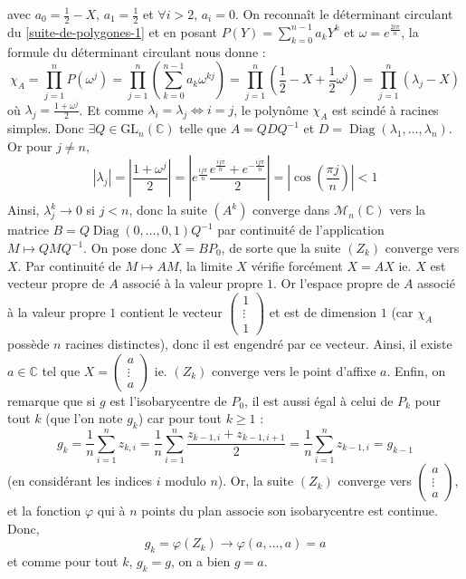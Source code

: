 \begin{demonstration}
		avec $a_0 = \frac{1}{2} - X$, $a_1 = \frac{1}{2}$ et $\forall i > 2, \, a_i = 0$. On reconnaît le déterminant circulant du \cref{suite-de-polygones-1} et en posant $P(Y) = \sum_{k=0}^{n-1} a_k Y^k$ et $\omega = e^{\frac{2i\pi}{n}}$, la formule du déterminant circulant nous donne :
		\[ \chi_A = \prod_{j=1}^n P(\omega^j) = \prod_{j=1}^n \left( \sum_{k=0}^{n-1} a_k \omega^{kj} \right) = \prod_{j=1}^n \left( \frac{1}{2} - X + \frac{1}{2} \omega^j \right) = \prod_{j=1}^n (\lambda_j - X) \]
		où $\lambda_j = \frac{1+\omega^j}{2}$. Et comme $\lambda_i = \lambda_j \iff i = j$, le polynôme $\chi_A$ est scindé à racines simples. Donc $\exists Q \in \mathrm{GL}_n(\mathbb{C})$ telle que $A=QDQ^{-1}$ et $D = \operatorname{Diag}(\lambda_1, \dots, \lambda_n)$.
		Or pour $j \neq n$,
		\[ |\lambda_j| = \left| \frac{1 + \omega^j}{2} \right| = \left| e^{\frac{ij \pi}{n}} \frac{e^{\frac{ij \pi}{n}} + e^{-\frac{ij \pi}{n}}}{2} \right| = \left| \cos \left( \frac{\pi j}{n} \right) \right| < 1 \]
		Ainsi, $\lambda_j^k \longrightarrow 0$ si $j < n$, donc la suite $(A^k)$ converge dans $\mathcal{M}_n(\mathbb{C})$ vers la matrice $B = Q \operatorname{Diag}(0, \dots, 0, 1)Q^{-1}$ par continuité de l'application $M \mapsto QMQ^{-1}$.
		\newpar
		On pose donc $X = B P_0$, de sorte que la suite $(Z_k)$ converge vers $X$. Par continuité de $M \mapsto AM$, la limite $X$ vérifie forcément $X = AX$ ie. $X$ est vecteur propre de $A$ associé à la valeur propre $1$. Or l'espace propre de $A$ associé à la valeur propre $1$ contient le vecteur $\begin{pmatrix} 1 \\ \vdots \\ 1 \end{pmatrix}$ et est de dimension $1$ (car $\chi_A$ possède $n$ racines distinctes), donc il est engendré par ce vecteur. Ainsi, il existe $a \in \mathbb{C}$ tel que $X = \begin{pmatrix} a \\ \vdots \\ a \end{pmatrix}$ ie. $(Z_k)$ converge vers le point d'affixe $a$.
		\newpar
		Enfin, on remarque que si $g$ est l'isobarycentre de $P_0$, il est aussi égal à celui de $P_k$ pour tout $k$ (que l'on note $g_k$) car pour tout $k \geq 1$ :
		\[ g_k = \frac{1}{n} \sum_{i=1}^n z_{k,i} = \frac{1}{n} \sum_{i=1}^n \frac{z_{k-1,i} + z_{k-1,i+1}}{2} = \frac{1}{n} \sum_{i=1}^n z_{k-1,i} = g_{k-1} \]
		(en considérant les indices $i$ modulo $n$). Or, la suite $(Z_k)$ converge vers $\begin{pmatrix} a \\ \vdots \\ a \end{pmatrix}$, et la fonction $\varphi$ qui à $n$ points du plan associe son isobarycentre est continue. Donc,
		\[ g_k = \varphi(Z_k) \longrightarrow \varphi(a, \dots, a) = a \]
		et comme pour tout $k$, $g_k = g$, on a bien $g = a$.
	\end{demonstration}

